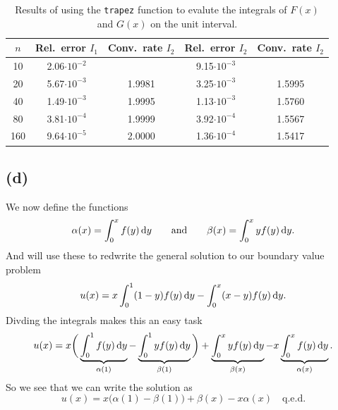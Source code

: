 \documentclass[a4paper, 11pt, notitlepage, english]{article}
\renewcommand{\d}{{\rm d}}
\begin{document}
\begin{table}[h]
\centering
    \begin{tabular}{c|c|c|c|c}
        $n$ & Rel.\ error $I_1$ & Conv.\ rate $I_2$ & Rel.\ error $I_2$ & Conv.\ rate $I_2$\\ \hline
10  & 2.06$\cdot 10^{-2}$ &  & 9.15$\cdot 10^{-3}$ \\ \hline
20  & 5.67$\cdot 10^{-3}$ & 1.9981  & 3.25$\cdot 10^{-3}$  & 1.5995\\ \hline
40  & 1.49$\cdot 10^{-3}$ & 1.9995  & 1.13$\cdot 10^{-3}$  & 1.5760\\ \hline
80  & 3.81$\cdot 10^{-4}$ & 1.9999  & 3.92$\cdot 10^{-4}$  & 1.5567\\ \hline
160 & 9.64$\cdot 10^{-5}$ & 2.0000 & 1.36$\cdot 10^{-4}$   & 1.5417 \\ 
    \end{tabular}
    \caption{Results of using the \texttt{trapez} function to evalute the integrals of $F(x)$ and $G(x)$ on the unit interval.\label{table:trapez}}
\end{table}

\clearpage

\subsection*{(d)}
We now define the functions
$$\alpha(x) = \int_0^x f(y) \, \d y \qquad \mbox{and} \qquad \beta(x) = \int_0^x yf(y) \, \d y.$$
And will use these to redwrite the general solution to our boundary value problem
$$u(x) = x\int_0^1 (1-y)f(y)\, \d y - \int_0^x (x-y)f(y)\, \d y.$$
Divding the integrals makes this an easy task
$$u(x) = x\bigg(\underbrace{\int_0^1 f(y) \, \d y}_{\alpha(1)} - \underbrace{\int_0^1 y f(y) \, \d y}_{\beta(1)}\bigg) + \underbrace{\int_0^x yf(y)\, \d y}_{\beta(x)} - x \underbrace{\int_0^x f(y)\, \d y}_{\alpha(x)}.$$
So we see that we can write the solution as
$$u(x) = x\big(\alpha(1)-\beta(1)\big) + \beta(x) - x\alpha(x) \quad \mbox{q.e.d.}$$

\clearpage
\end{document}
